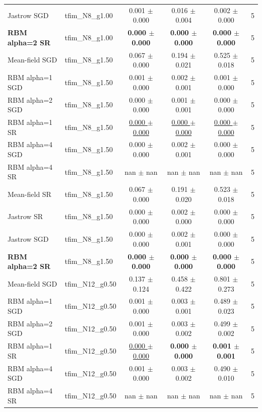 \begin{tabular}{llcccc}
Jastrow SGD & tfim\_N8\_g1.00 & 0.001 $\pm$ 0.000 & 0.016 $\pm$ 0.004 & 0.002 $\pm$ 0.000 & 5 \\
\textbf{RBM alpha=2 SR} & tfim\_N8\_g1.00 & \textbf{0.000 $\pm$ 0.000} & \textbf{0.000 $\pm$ 0.000} & \textbf{0.000 $\pm$ 0.000} & 5 \\
\midrule
Mean-field SGD & tfim\_N8\_g1.50 & 0.067 $\pm$ 0.000 & 0.194 $\pm$ 0.021 & 0.525 $\pm$ 0.018 & 5 \\
RBM alpha=1 SGD & tfim\_N8\_g1.50 & 0.001 $\pm$ 0.000 & 0.002 $\pm$ 0.001 & 0.001 $\pm$ 0.000 & 5 \\
RBM alpha=2 SGD & tfim\_N8\_g1.50 & 0.000 $\pm$ 0.000 & 0.001 $\pm$ 0.001 & 0.000 $\pm$ 0.000 & 5 \\
RBM alpha=1 SR & tfim\_N8\_g1.50 & \underline{0.000 $\pm$ 0.000} & \underline{0.000 $\pm$ 0.000} & \underline{0.000 $\pm$ 0.000} & 5 \\
RBM alpha=4 SGD & tfim\_N8\_g1.50 & 0.000 $\pm$ 0.000 & 0.002 $\pm$ 0.001 & 0.000 $\pm$ 0.000 & 5 \\
RBM alpha=4 SR & tfim\_N8\_g1.50 & nan $\pm$ nan & nan $\pm$ nan & nan $\pm$ nan & 5 \\
Mean-field SR & tfim\_N8\_g1.50 & 0.067 $\pm$ 0.000 & 0.191 $\pm$ 0.020 & 0.523 $\pm$ 0.018 & 5 \\
Jastrow SR & tfim\_N8\_g1.50 & 0.000 $\pm$ 0.000 & 0.002 $\pm$ 0.000 & 0.000 $\pm$ 0.000 & 5 \\
Jastrow SGD & tfim\_N8\_g1.50 & 0.000 $\pm$ 0.000 & 0.002 $\pm$ 0.001 & 0.000 $\pm$ 0.000 & 5 \\
\textbf{RBM alpha=2 SR} & tfim\_N8\_g1.50 & \textbf{0.000 $\pm$ 0.000} & \textbf{0.000 $\pm$ 0.000} & \textbf{0.000 $\pm$ 0.000} & 5 \\
\midrule
Mean-field SGD & tfim\_N12\_g0.50 & 0.137 $\pm$ 0.124 & 0.458 $\pm$ 0.422 & 0.801 $\pm$ 0.273 & 5 \\
RBM alpha=1 SGD & tfim\_N12\_g0.50 & 0.001 $\pm$ 0.000 & 0.003 $\pm$ 0.001 & 0.489 $\pm$ 0.023 & 5 \\
RBM alpha=2 SGD & tfim\_N12\_g0.50 & 0.001 $\pm$ 0.000 & 0.003 $\pm$ 0.002 & 0.499 $\pm$ 0.002 & 5 \\
RBM alpha=1 SR & tfim\_N12\_g0.50 & \underline{0.000 $\pm$ 0.000} & \textbf{0.000 $\pm$ 0.000} & \textbf{0.001 $\pm$ 0.001} & 5 \\
RBM alpha=4 SGD & tfim\_N12\_g0.50 & 0.001 $\pm$ 0.000 & 0.003 $\pm$ 0.002 & 0.490 $\pm$ 0.010 & 5 \\
RBM alpha=4 SR & tfim\_N12\_g0.50 & nan $\pm$ nan & nan $\pm$ nan & nan $\pm$ nan & 5 \\

\end{tabular}
